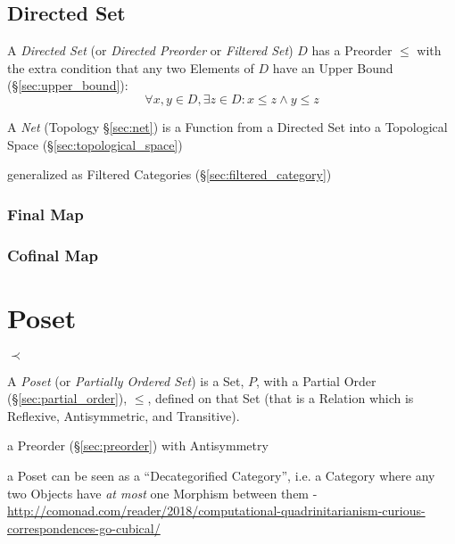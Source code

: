 \subsection{Directed Set}\label{sec:directed_set}

A \emph{Directed Set} (or \emph{Directed Preorder} or \emph{Filtered
  Set}) $D$ has a Preorder $\leq$ with the extra condition that any
two Elements of $D$ have an Upper Bound (\S\ref{sec:upper_bound}):
\[
  \forall x, y \in D, \exists z \in D : x \leq z \wedge y \leq z
\]

\fist A \emph{Net} (Topology \S\ref{sec:net}) is a Function from a Directed Set
into a Topological Space (\S\ref{sec:topological_space})

\fist generalized as Filtered Categories (\S\ref{sec:filtered_category})



\subsubsection{Final Map}\label{sec:final_map}

\subsubsection{Cofinal Map}\label{sec:cofinal_map}



\section{Poset}\label{sec:poset}

$\prec$

A \emph{Poset} (or \emph{Partially Ordered Set}) is a Set, $P$, with a
Partial Order (\S\ref{sec:partial_order}), $\leq$, defined on that
Set (that is a Relation which is Reflexive, Antisymmetric, and
Transitive).

a Preorder (\S\ref{sec:preorder}) with Antisymmetry

a Poset can be seen as a ``Decategorified Category'', i.e. a Category where any
two Objects have \emph{at most} one Morphism between them -
\url{http://comonad.com/reader/2018/computational-quadrinitarianism-curious-correspondences-go-cubical/}

